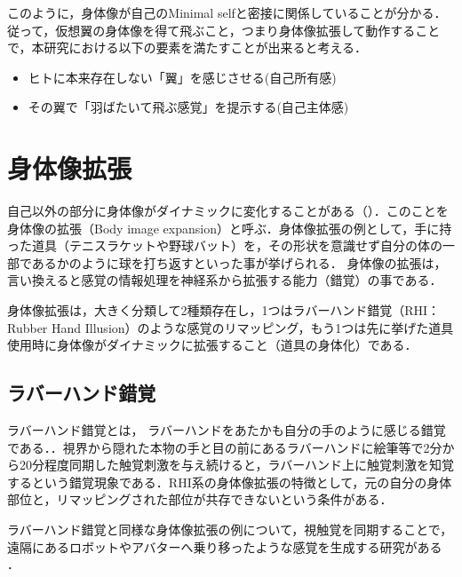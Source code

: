     このように，身体像が自己のMinimal selfと密接に関係していることが分かる．従って，仮想翼の身体像を得て飛ぶこと，つまり身体像拡張して動作することで，本研究における以下の要素を満たすことが出来ると考える．

    \begin{itemize}
        \item ヒトに本来存在しない「翼」を感じさせる(自己所有感)
        \item その翼で「羽ばたいて飛ぶ感覚」を提示する(自己主体感)
    \end{itemize}

\section{身体像拡張}
    

    自己以外の部分に身体像がダイナミックに変化することがある（）．このことを身体像の拡張（Body image expansion）と呼ぶ．身体像拡張の例として，手に持った道具（テニスラケットや野球バット）を，その形状を意識せず自分の体の一部であるかのように球を打ち返すといった事が挙げられる\cite{渡辺貴文2005仮想道具による身体像拡張の評価手法に関する研究}．
    身体像の拡張は，言い換えると感覚の情報処理を神経系から拡張する能力（錯覚）の事である．

    身体像拡張は，大きく分類して2種類存在し，1つはラバーハンド錯覚（RHI：Rubber Hand Illusion）\cite{botvinick1998rubber}のような感覚のリマッピング，もう1つは先に挙げた道具使用時に身体像がダイナミックに拡張すること（道具の身体化）である．

\subsection{ラバーハンド錯覚}

    ラバーハンド錯覚とは， ラバーハンドをあたかも自分の手のように感じる錯覚である．．視界から隠れた本物の手と目の前にあるラバーハンドに絵筆等で2分から20分程度同期した触覚刺激を与え続けると，ラバーハンド上に触覚刺激を知覚するという錯覚現象である．RHI系の身体像拡張の特徴として，元の自分の身体部位と，リマッピングされた部位が共存できないという条件がある．

    ラバーハンド錯覚と同様な身体像拡張の例について，視触覚を同期することで，遠隔にあるロボットやアバターへ乗り移ったような感覚を生成する研究がある
    \cite{tachi2015telexistence}\cite{ehrsson2004s}\cite{slater2008towards}\cite{iwasaki2017research}\cite{petkova2008if}．

